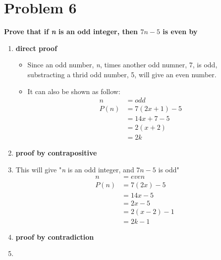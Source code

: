 \documentclass[english,10pt,a4paper]{article}
\begin{document}
\section*{Problem 6}
\textbf{Prove that if \textit{n} is an odd integer, then $7n-5$ is even by}
\begin{enumerate}[a]
\item \textbf{direct proof}
\begin{itemize}
\item  Since an odd number, \textit{n}, times another odd numner, 7, is odd, substracting a thrid odd number, 5, will give an even number.
\item It can also be shown as follow:
\begin{align}
n&=odd\\
P(n)&=7(2x+1)-5\\
	&=14x+7-5\\
	&=2(x+2)\\
	&=2k
\end{align}
\end{itemize}
\item \textbf{proof by contrapositive}
\item[] This will give "\textit{n} is an odd integer, and $7n-5$ is odd"
\begin{align}
n&=even\\
P(n)&=7(2x)-5\\
	&=14x-5\\
	&=2x-5\\
	&=2(x-2)-1\\
	&=2k-1
\end{align}
\item \textbf{proof by contradiction}
\item []
\end{enumerate}
\end{document}
